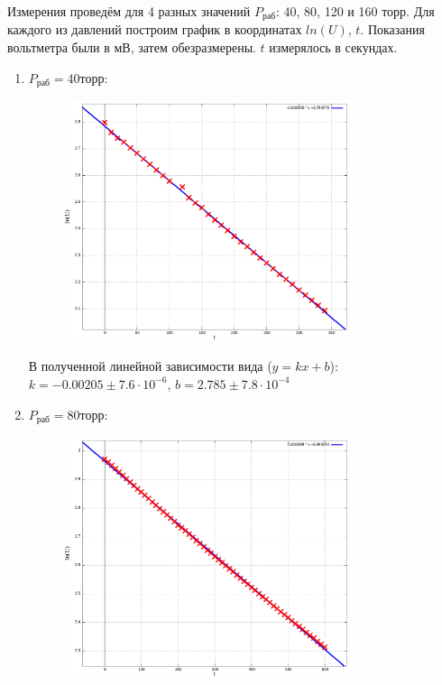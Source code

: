 \documentclass{article}
\begin{document}
Измерения проведём для 4 разных значений $P_{\text{раб}}$: 40, 80, 120 и 160 торр.
Для каждого из давлений построим график в координатах $
ln(U)$, $t$. Показания вольтметра были в мВ, затем обезразмерены. $t$ измерялось в секундах.
\begin{enumerate}
    \item \textbf{$P_{\text{раб}} = 40\text{торр}$}:
        \begin{figure}[H]
            \centering
            \includegraphics[width=0.8\textwidth]{graph1.png}
        \end{figure}

        В полученной линейной зависимости вида ($y = kx + b$):\\
        $k = -0.00205 \pm 7.6\cdot 10^{-6}$, $b = 2.785 \pm 7.8\cdot10^{-4}$

        \item \textbf{$P_{\text{раб}} = 80\text{торр}$}:
    \begin{figure}[H]
        \centering
        \includegraphics[width=0.8\textwidth]{graph2.png}
    \end{figure}


\end{enumerate}
\end{document}
